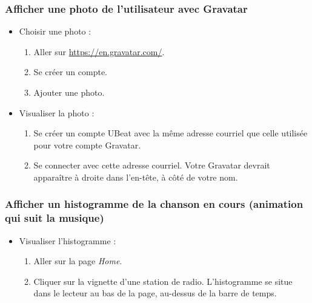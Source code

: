 \documentclass[12pt, letterpaper]{article}
\begin{document}
    \subsubsection*{Afficher une photo de l’utilisateur avec Gravatar}
    \begin{itemize}
        \item Choisir une photo :
        \begin{enumerate}
            \item Aller sur \url{https://en.gravatar.com/}.
            \item Se créer un compte.
            \item Ajouter une photo.
        \end{enumerate}

        \item Visualiser la photo :
        \begin{enumerate}
            \item Se créer un compte UBeat avec la même adresse courriel que celle utilisée pour votre compte Gravatar.
            \item Se connecter avec cette adresse courriel. Votre Gravatar devrait apparaître à droite dans l'en-tête, à côté de votre nom.
        \end{enumerate}
    \end{itemize}
    
    \subsubsection*{Afficher un histogramme de la chanson en cours (animation qui suit la musique)}
    \begin{itemize}
        \item Visualiser l'histogramme :
        \begin{enumerate}
            \item Aller sur la page \textit{Home}.
            \item Cliquer sur la vignette d'une station de radio. L'histogramme se situe dans le lecteur au bas de la page, au-dessus de la barre de temps.
        \end{enumerate}
    \end{itemize}
\end{document}
